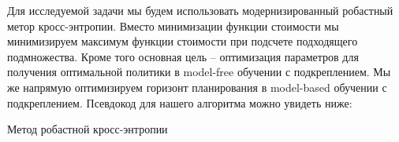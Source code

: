Для исследуемой задачи мы будем использовать модернизированный робастный метор кросс-энтропии. Вместо минимизации функции стоимости мы минимизируем максимум функции стоимости при подсчете подходящего подмножества. Кроме того основная цель -- оптимизация параметров для получения оптимальной политики в model-free обучении с подкреплением. Мы же напрямую оптимизируем горизонт планирования в model-based обучении с подкреплением. Псевдокод для нашего алгоритма можно увидеть ниже: \newpage

\begin{algorithm}
	\caption{Метод робастной кросс-энтропии}\label{cem}
	\begin{algorithmic}[1]
		
		
		\EndFor
		\EndWhile
	\end{algorithmic}
\end{algorithm}




